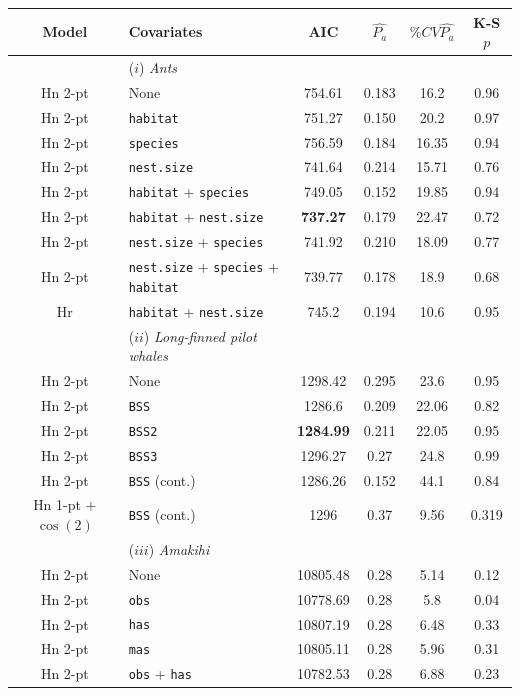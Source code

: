 \begin{table}
\centering
\begin{tabular}{c l c c c c}
Model & Covariates & AIC & $\hat{P_a}$ & $\% CV \hat{P_a}$ & K-S $p$\\
\hline
 & ($i$) \textit{Ants} & & & & \\
Hn 2-pt & None & 754.61 & 0.183 & 16.2 & 0.96 \\
Hn 2-pt & \texttt{habitat} & 751.27 & 0.150 & 20.2 & 0.97 \\ 
Hn 2-pt & \texttt{species} & 756.59 & 0.184 & 16.35 & 0.94 \\  
Hn 2-pt & \texttt{nest.size} & 741.64 & 0.214 & 15.71 & 0.76 \\   
Hn 2-pt & \texttt{habitat} + \texttt{species} & 749.05 & 0.152 & 19.85 & 0.94\\ 
Hn 2-pt & \texttt{habitat} + \texttt{nest.size} & \textbf{737.27} & 0.179 & 22.47 & 0.72\\
Hn 2-pt & \texttt{nest.size} + \texttt{species} & 741.92 & 0.210 & 18.09 & 0.77\\
Hn 2-pt & \texttt{nest.size} + \texttt{species} + \texttt{habitat} & 739.77 & 0.178 & 18.9 & 0.68 \\
Hr & \texttt{habitat} + \texttt{nest.size} & 745.2 & 0.194 & 10.6 & 0.95\\
 & ($ii$) \textit{Long-finned pilot whales} & & & & \\
Hn 2-pt & None & 1298.42 & 0.295 & 23.6 & 0.95 \\
Hn 2-pt & \texttt{BSS} & 1286.6 & 0.209 & 22.06 & 0.82 \\
Hn 2-pt & \texttt{BSS2} & \textbf{1284.99} & 0.211 &  22.05 & 0.95\\
Hn 2-pt & \texttt{BSS3} & 1296.27 & 0.27 & 24.8 & 0.99 \\
Hn 2-pt & \texttt{BSS} (cont.) &  1286.26 & 0.152 & 44.1 & 0.84\\
Hn 1-pt + $\cos(2)$& \texttt{BSS} (cont.) & 1296 & 0.37 & 9.56 & 0.319 \\
 & ($iii$) \textit{Amakihi} & & & & \\
Hn 2-pt & None & 10805.48 & 0.28 & 5.14 & 0.12 \\
Hn 2-pt & \texttt{obs} & 10778.69 & 0.28 & 5.8 & 0.04\\
Hn 2-pt & \texttt{has} & 10807.19 &  0.28 & 6.48 & 0.33\\
Hn 2-pt & \texttt{mas} & 10805.11 &  0.28 & 5.96 & 0.31\\
Hn 2-pt & \texttt{obs} + \texttt{has} & 10782.53 & 0.28 & 6.88 & 0.23\\

\end{tabular}
\end{table}
